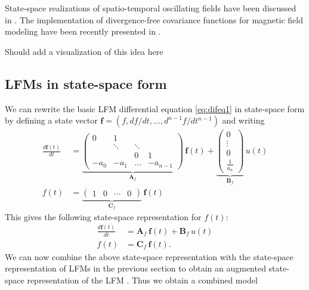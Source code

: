 \documentclass[journal]{IEEEtran}
\newcommand{\simo}[1]{{\color{red}#1}}
\begin{document}
State-space realizations of spatio-temporal oscillating fields have been discussed in \cite{Solin+Sarkka:2013}. The implementation of divergence-free covariance functions for magnetic field modeling have been recently presented in \cite{Solin:2015}.

\simo{Should add a visualization of this idea here}

\subsection{LFMs in state-space form}
%
We can rewrite the basic LFM differential equation \eqref{eq:difeq1} in state-space form by defining a state vector $\mathbf{f} = (f, df/dt,\ldots,d^{n-1}f/dt^{n-1})$ and writing
%
\begin{equation}
\begin{split}
  \frac{d\mathbf{f}(t)}{dt}
  &= \underbrace{\begin{pmatrix}
       0             & 1      &        &       \\
                     & \ddots & \ddots &       \\
                     &         &  0    &     1 \\
   -a_0 & -a_1 & \hdots &  -a_{n-1}
  \end{pmatrix}}_{\mathbf{A}_f} \, \mathbf{f}(t)
  + \underbrace{\begin{pmatrix}
      0 \\
      \vdots \\
      0 \\
      \frac{1}{a_n}
  \end{pmatrix}}_{\mathbf{B}_f} \,
   u(t) \\
   f(t) &= \underbrace{\begin{pmatrix}
     1 & 0 & \cdots & 0
   \end{pmatrix}}_{\mathbf{C}_f} \, \mathbf{f}(t)
\end{split}
\label{eq:ss1}
\end{equation}
%
This gives the following state-space representation for $f(t)$:
%
\begin{equation}
\begin{split}
  \frac{d\mathbf{f}(t)}{dt}
  &= \mathbf{A}_f \, \mathbf{f}(t) + \mathbf{B}_f \, u(t) \\
  f(t) &= \mathbf{C}_f \, \mathbf{f}(t).
\end{split}
\label{eq:ssgen}
\end{equation}
%
We can now combine the above state-space representation with the state-space representation of LFMs in the previous section to obtain an augmented state-space representation of the LFM \cite{Hartikainen+Sarkka:2011,Hartikainen+Seppanen+Sarkka:2012}. Thus we obtain a combined model
\end{document}
